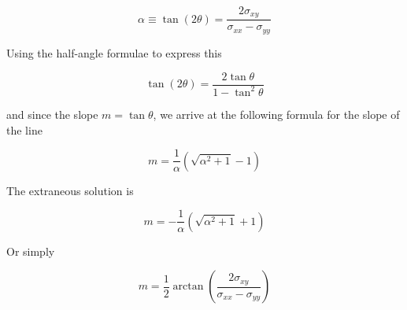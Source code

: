 \documentclass{article}
\newcommand{\sxx}{\ensuremath{\sigma_{xx}}}
\newcommand{\sxy}{\ensuremath{\sigma_{xy}}}
\newcommand{\syy}{\ensuremath{\sigma_{yy}}}
\begin{document}
\begin{equation}
\alpha \equiv \tan \left( 2 \theta \right) = \frac{2 \sxy}{\sxx - \syy}
\end{equation}

Using the half-angle formulae to express this

\begin{equation}
\tan \left( 2 \theta \right) = \frac{2 \tan \theta}{1 - \tan^{2} \theta}
\end{equation}

and since the slope $m = \tan \theta $, we arrive at the following formula for the slope of the line

\begin{equation}
m = \frac{1}{\alpha} \left( \sqrt{\alpha^{2} + 1} - 1\right)
\end{equation}

The extraneous solution is

\begin{equation}
m = - \frac{1}{\alpha} \left( \sqrt{\alpha^{2} + 1} + 1\right)
\end{equation}

Or simply

\begin{equation}
m = \frac{1}{2} \arctan \left( \frac{2 \sxy}{\sxx - \syy} \right)
\end{equation}
\end{document}
